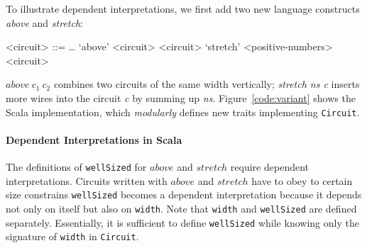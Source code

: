 
To illustrate dependent interpretations, we first add two new language 
constructs \emph{above} and \emph{stretch}:
\setlength{\grammarindent}{5em} %
\begin{grammar}
<circuit> ::= \ldots
\alt `above' <circuit> <circuit>
\alt `stretch' <positive-numbers> <circuit>
\end{grammar}
$above\ c_1\ c_2$ combines two circuits of the same width vertically;
\emph{stretch ns c} inserts more wires into the circuit \emph{c} by
summing up \emph{ns}.
Figure~\ref{code:variant} shows the Scala implementation, which
\emph{modularly} defines new traits implementing \lstinline{Circuit}.



\paragraph{Dependent Interpretations in Scala}
The definitions of \lstinline{wellSized} for $above$ and $stretch$
require dependent interpretations.
Circuits written with $above$ and $stretch$ have to obey to certain
size constrains%
\lstinline{wellSized} becomes a dependent interpretation
because it depends not only on itself but also on \lstinline{width}.
Note that \lstinline{width} and \lstinline{wellSized} are defined separately.
Essentially, it is sufficient to define \lstinline{wellSized} while
knowing only the signature of \lstinline{width} in \lstinline{Circuit}.

